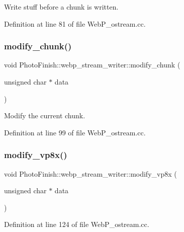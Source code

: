 Write stuff before a chunk is written. 



Definition at line 81 of file Web\+P\+\_\+ostream.\+cc.

\mbox{\label{class_photo_finish_1_1webp__stream__writer_a2c820fe74573fec2da615c31d93d495e}} 
\subsubsection{\texorpdfstring{modify\+\_\+chunk()}{modify\_chunk()}}
{\footnotesize\ttfamily void Photo\+Finish\+::webp\+\_\+stream\+\_\+writer\+::modify\+\_\+chunk (\begin{DoxyParamCaption}\item[{unsigned char $\ast$}]{data }\end{DoxyParamCaption})}



Modify the current chunk. 



Definition at line 99 of file Web\+P\+\_\+ostream.\+cc.

\mbox{\label{class_photo_finish_1_1webp__stream__writer_ac31f3881d6e8ce55d58aa0259ab1ac66}} 
\subsubsection{\texorpdfstring{modify\+\_\+vp8x()}{modify\_vp8x()}}
{\footnotesize\ttfamily void Photo\+Finish\+::webp\+\_\+stream\+\_\+writer\+::modify\+\_\+vp8x (\begin{DoxyParamCaption}\item[{unsigned char $\ast$}]{data }\end{DoxyParamCaption})}



Definition at line 124 of file Web\+P\+\_\+ostream.\+cc.

